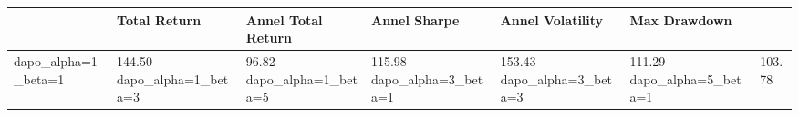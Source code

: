 \begin{tabular}{llllll}
\toprule
 & Total Return & Annel Total Return & Annel Sharpe & Annel Volatility & Max Drawdown \\
\midrule
dapo_alpha=1_beta=1 & 144.50%
dapo_alpha=1_beta=3 & 96.82%
dapo_alpha=1_beta=5 & 115.98%
dapo_alpha=3_beta=1 & 153.43%
dapo_alpha=3_beta=3 & 111.29%
dapo_alpha=5_beta=1 & 103.78%
\bottomrule
\end{tabular}
